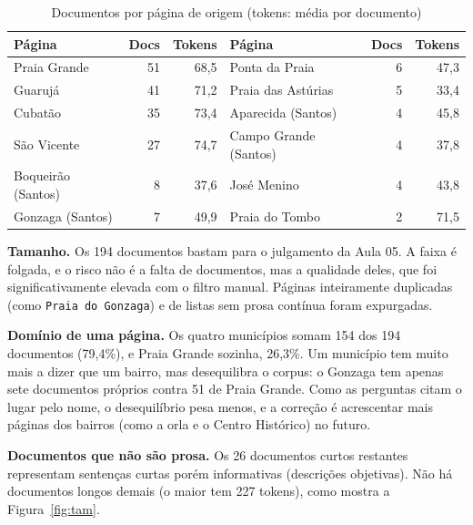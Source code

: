 \documentclass[
  article,
  12pt,
  oneside,
  a4paper,
  english,
  brazil
]{abntex2}
\begin{document}
\begin{table}[htb]
  \centering
  \caption{Documentos por página de origem (tokens: média por documento)}
  \label{tab:origem}
  \footnotesize
  \begin{tabular}{@{}lrr@{\hspace{1.5em}}lrr@{}}
    \toprule
    \textbf{Página} & \textbf{Docs} & \textbf{Tokens} & \textbf{Página} & \textbf{Docs} & \textbf{Tokens} \\
    \midrule
    Praia Grande      & 51 & 68,5 & Ponta da Praia       & 6 & 47,3 \\
    Guarujá           & 41 & 71,2 & Praia das Astúrias   & 5 & 33,4 \\
    Cubatão           & 35 & 73,4 & Aparecida (Santos)   & 4 & 45,8 \\
    São Vicente       & 27 & 74,7 & Campo Grande (Santos)& 4 & 37,8 \\
    Boqueirão (Santos)&  8 & 37,6 & José Menino          & 4 & 43,8 \\
    Gonzaga (Santos)  &  7 & 49,9 & Praia do Tombo       & 2 & 71,5 \\
    \bottomrule
  \end{tabular}
\end{table}

\textbf{Tamanho.} Os 194 documentos bastam para o julgamento da Aula 05. A faixa
é folgada, e o risco não é a falta de documentos, mas a qualidade deles, que
foi significativamente elevada com o filtro manual. Páginas inteiramente duplicadas
(como \texttt{Praia do Gonzaga}) e de listas sem prosa contínua foram expurgadas.

\textbf{Domínio de uma página.} Os quatro municípios somam 154 dos 194
documentos (79,4\%), e Praia Grande sozinha, 26,3\%. Um
município tem muito mais a dizer que um bairro, mas desequilibra o corpus:
o Gonzaga tem apenas sete documentos próprios contra 51 de Praia Grande. Como as
perguntas citam o lugar pelo nome, o desequilíbrio pesa menos, e a correção é
acrescentar mais páginas dos bairros (como a orla e o Centro Histórico) no futuro.

\textbf{Documentos que não são prosa.} Os 26 documentos curtos restantes representam
sentenças curtas porém informativas (descrições objetivas). Não há documentos longos 
demais (o maior tem 227 tokens), como mostra a Figura~\ref{fig:tam}.
\end{document}

